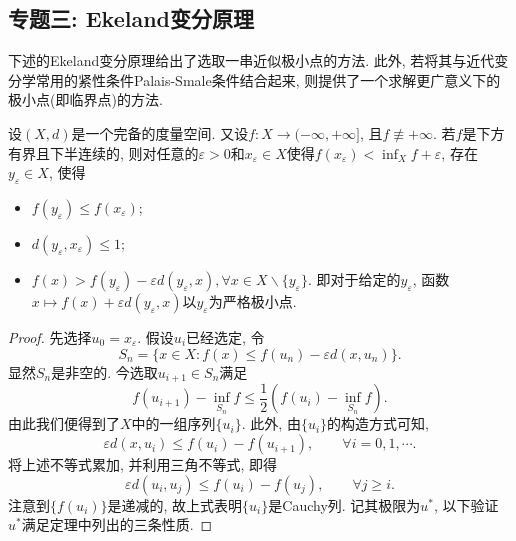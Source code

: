 \subsection{专题三: Ekeland变分原理}

下述的Ekeland变分原理给出了选取一串近似极小点的方法. 此外, 若将其与近代变分学常用的紧性条件Palais-Smale条件结合起来, 则提供了一个求解更广意义下的极小点(即临界点)的方法. 

\begin{theorem}[Ekeland]
    设$(X, d)$是一个完备的度量空间. 又设$f\colon X \rightarrow (-\infty, +\infty]$, 且$f \not\equiv +\infty$.
    若$f$是下方有界且下半连续的, 则对任意的$\varepsilon > 0$和$x_{\varepsilon} \in X$使得$f(x_{\varepsilon}) < \inf_X f + \varepsilon$, 存在$y_{\varepsilon} \in X$, 使得 
    \begin{itemize}
        \item $f(y_{\varepsilon}) \leq f(x_{\varepsilon})$; 
        \item $d(y_{\varepsilon}, x_{\varepsilon}) \leq 1$;
        \item $f(x) > f(y_{\varepsilon}) - \varepsilon d(y_{\varepsilon}, x), \forall x \in X \smallsetminus \{y_{\varepsilon}\}$.
        即对于给定的$y_{\varepsilon}$, 函数$x \mapsto f(x) + \varepsilon d(y_{\varepsilon}, x)$以$y_{\varepsilon}$为严格极小点.
    \end{itemize}
    \begin{proof}
        先选择$u_0 = x_{\varepsilon}$. 假设$u_i$已经选定, 令 
        \begin{equation*}
            S_n = \{x \in X\colon f(x) \leq f(u_n) - \varepsilon d(x, u_n)\}.
        \end{equation*}
        显然$S_n$是非空的. 今选取$u_{i + 1} \in S_n$满足 
        \begin{equation}\label{46}
            f(u_{i + 1}) - \inf_{S_n}f \leq \frac{1}{2}\left(f(u_i) - \inf_{S_n}f\right).
        \end{equation}
        由此我们便得到了$X$中的一组序列$\{u_i\}$. 此外, 由$\{u_i\}$的构造方式可知, 
        \begin{equation*}
            \varepsilon d(x, u_i) \leq f(u_i) - f(u_{i + 1}), \qquad \forall i = 0, 1, \cdots.
        \end{equation*}
        将上述不等式累加, 并利用三角不等式, 即得 
        \begin{equation}\label{47}
            \varepsilon d(u_i, u_j) \leq f(u_i) - f(u_j), \qquad \forall j \geq i.
        \end{equation}
        注意到$\{f(u_i)\}$是递减的, 故上式表明$\{u_i\}$是Cauchy列. 记其极限为$u^*$, 以下验证$u^*$满足定理中列出的三条性质.


\end{proof}
\end{theorem}
